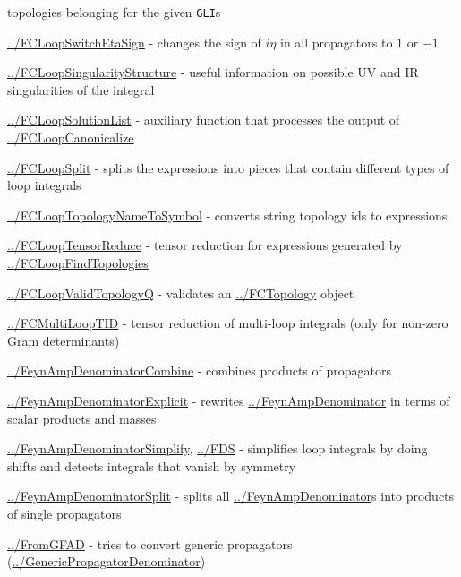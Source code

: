 \documentclass[../FeynCalcManual.tex]{subfiles}
\begin{document}
\begin{itemize}
{  topologies belonging for the given \texttt{GLI}s
\item
  \hyperlink{../fcloopswitchetasign}{../FCLoopSwitchEtaSign} - changes
  the sign of \(i \eta\) in all propagators to \(1\) or \(-1\)
\item
  \hyperlink{../fcloopsingularitystructure}{../FCLoopSingularityStructure}
  - useful information on possible UV and IR singularities of the
  integral
\item
  \hyperlink{../fcloopsolutionlist}{../FCLoopSolutionList} - auxiliary
  function that processes the output of
  \hyperlink{../fcloopcanonicalize}{../FCLoopCanonicalize}
\item
  \hyperlink{../fcloopsplit}{../FCLoopSplit} - splits the expressions
  into pieces that contain different types of loop integrals
\item
  \hyperlink{../fclooptopologynametosymbol}{../FCLoopTopologyNameToSymbol}
  - converts string topology ids to expressions
\item
  \hyperlink{../fclooptensorreduce}{../FCLoopTensorReduce} - tensor
  reduction for expressions generated by
  \hyperlink{../fcloopfindtopologies}{../FCLoopFindTopologies}
\item
  \hyperlink{../fcloopvalidtopologyq}{../FCLoopValidTopologyQ} -
  validates an \hyperlink{../fctopology}{../FCTopology} object
\item
  \hyperlink{../fcmultilooptid}{../FCMultiLoopTID} - tensor reduction of
  multi-loop integrals (only for non-zero Gram determinants)
\item
  \hyperlink{../feynampdenominatorcombine}{../FeynAmpDenominatorCombine}
  - combines products of propagators
\item
  \hyperlink{../feynampdenominatorexplicit}{../FeynAmpDenominatorExplicit}
  - rewrites \hyperlink{../feynampdenominator}{../FeynAmpDenominator} in
  terms of scalar products and masses
\item
  \hyperlink{../feynampdenominatorsimplify}{../FeynAmpDenominatorSimplify},
  \hyperlink{../fds}{../FDS} - simplifies loop integrals by doing shifts
  and detects integrals that vanish by symmetry
\item
  \hyperlink{../feynampdenominatorsplit}{../FeynAmpDenominatorSplit} -
  splits all \hyperlink{../feynampdenominator}{../FeynAmpDenominator}s
  into products of single propagators
\item
  \hyperlink{../fromgfad}{../FromGFAD} - tries to convert generic
  propagators
  (\hyperlink{../genericpropagatordenominator}{../GenericPropagatorDenominator})
}
\end{itemize}
\end{document}
